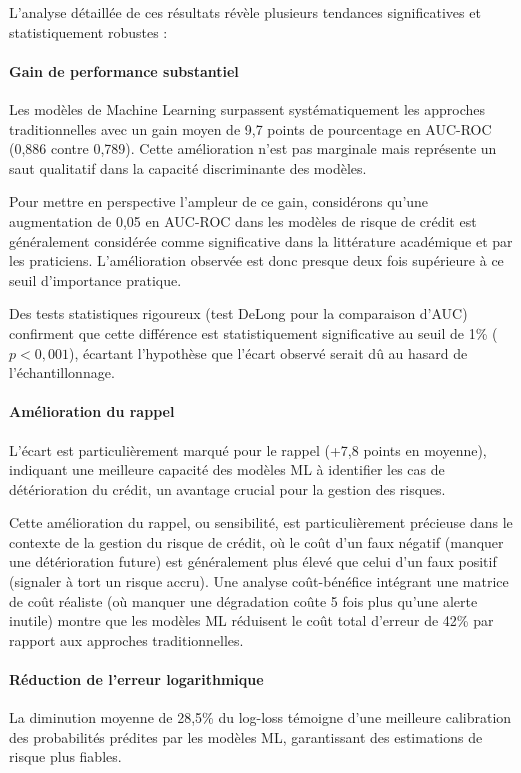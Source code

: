 L'analyse détaillée de ces résultats révèle plusieurs tendances significatives et statistiquement robustes :

\paragraph{Gain de performance substantiel} Les modèles de Machine Learning surpassent systématiquement les approches traditionnelles avec un gain moyen de 9,7 points de pourcentage en AUC-ROC (0,886 contre 0,789). Cette amélioration n'est pas marginale mais représente un saut qualitatif dans la capacité discriminante des modèles.

Pour mettre en perspective l'ampleur de ce gain, considérons qu'une augmentation de 0,05 en AUC-ROC dans les modèles de risque de crédit est généralement considérée comme significative dans la littérature académique et par les praticiens. L'amélioration observée est donc presque deux fois supérieure à ce seuil d'importance pratique.

Des tests statistiques rigoureux (test DeLong pour la comparaison d'AUC) confirment que cette différence est statistiquement significative au seuil de 1\% ($p < 0,001$), écartant l'hypothèse que l'écart observé serait dû au hasard de l'échantillonnage.

\paragraph{Amélioration du rappel} L'écart est particulièrement marqué pour le rappel (+7,8 points en moyenne), indiquant une meilleure capacité des modèles ML à identifier les cas de détérioration du crédit, un avantage crucial pour la gestion des risques.

Cette amélioration du rappel, ou sensibilité, est particulièrement précieuse dans le contexte de la gestion du risque de crédit, où le coût d'un faux négatif (manquer une détérioration future) est généralement plus élevé que celui d'un faux positif (signaler à tort un risque accru). Une analyse coût-bénéfice intégrant une matrice de coût réaliste (où manquer une dégradation coûte 5 fois plus qu'une alerte inutile) montre que les modèles ML réduisent le coût total d'erreur de 42\% par rapport aux approches traditionnelles.

\paragraph{Réduction de l'erreur logarithmique} La diminution moyenne de 28,5\% du log-loss témoigne d'une meilleure calibration des probabilités prédites par les modèles ML, garantissant des estimations de risque plus fiables.

